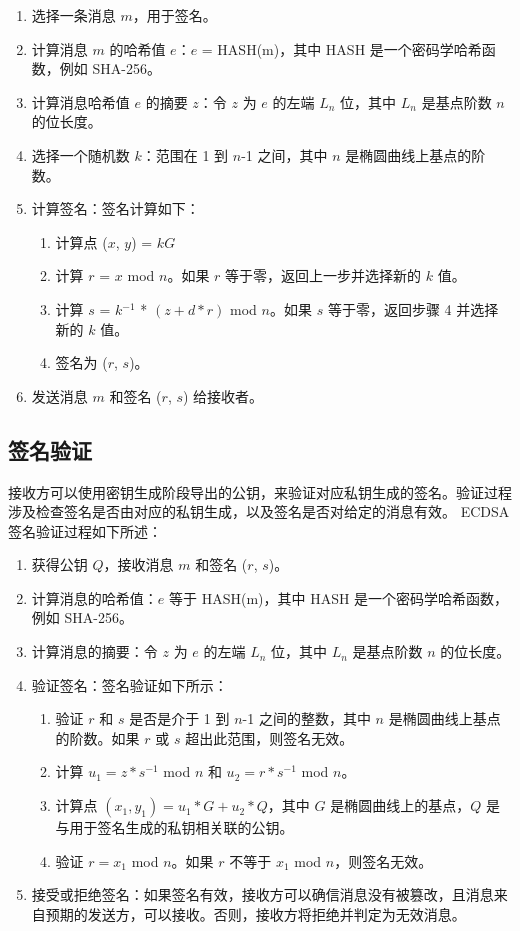 \documentclass[main\_\_CN.tex]{subfiles}
\begin{document}
\begin{enumerate}
    \item 选择一条消息 $m$，用于签名。
    \item 计算消息 $m$ 的哈希值 $e$：$e$ = HASH(m)，其中 HASH 是一个密码学哈希函数，例如 SHA-256。
    \item 计算消息哈希值 $e$ 的摘要 $z$：令 $z$ 为 $e$ 的左端 $L_n$ 位，其中 $L_n$ 是基点阶数 $n$ 的位长度。
    \item 选择一个随机数 $k$：范围在 1 到 $n$-1 之间，其中 $n$ 是椭圆曲线上基点的阶数。
    \item 计算签名：签名计算如下：
          \begin{enumerate}
              \item 计算点 ($x$, $y$) = $kG$
              \item 计算 $r$ = $x$ \textrm{mod} $n$。如果 $r$ 等于零，返回上一步并选择新的 $k$ 值。
              \item 计算 $s$ = $k$$^{-1}$ * $(z + d*r)$ \textrm{mod} $n$。如果 $s$ 等于零，返回步骤 4 并选择新的 $k$ 值。
              \item 签名为 ($r$, $s$)。
          \end{enumerate}
    \item 发送消息 $m$ 和签名 ($r$, $s$) 给接收者。
\end{enumerate}

\subsection{签名验证}

接收方可以使用密钥生成阶段导出的公钥，来验证对应私钥生成的签名。验证过程涉及检查签名是否由对应的私钥生成，以及签名是否对给定的消息有效。
ECDSA 签名验证过程如下所述：

\begin{enumerate}
    \item 获得公钥 $Q$，接收消息 $m$ 和签名 ($r$, $s$)。
    \item 计算消息的哈希值：$e$ 等于 HASH(m)，其中 HASH 是一个密码学哈希函数，例如 SHA-256。
    \item 计算消息的摘要：令 $z$ 为 $e$ 的左端 $L_n$ 位，其中 $L_n$ 是基点阶数 $n$ 的位长度。
    \item 验证签名：签名验证如下所示：
        \begin{enumerate}
            \item 验证 $r$ 和 $s$ 是否是介于 1 到 $n$-1 之间的整数，其中 $n$ 是椭圆曲线上基点的阶数。如果 $r$ 或 $s$ 超出此范围，则签名无效。
            \item 计算 $u_1 = z * s^{-1}$ \textrm{mod} $n$ 和 $u_2 = r * s^{-1}$ \textrm{mod} $n$。
            \item 计算点 $(x_1, y_1) = u_1 * G + u_2 * Q$，其中 $G$ 是椭圆曲线上的基点，$Q$ 是与用于签名生成的私钥相关联的公钥。
            \item 验证 $r = x_1$ \textrm{mod} $n$。如果 $r$ 不等于 $x_1$ \textrm{mod} $n$，则签名无效。
        \end{enumerate}
    \item 接受或拒绝签名：如果签名有效，接收方可以确信消息没有被篡改，且消息来自预期的发送方，可以接收。否则，接收方将拒绝并判定为无效消息。
\end{enumerate}
\end{document}
